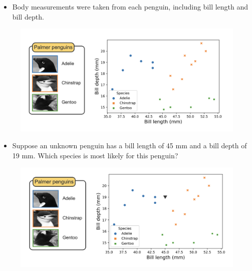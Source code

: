 \documentclass[8pt,dvipsnames]{beamer}
\begin{document}
\begin{frame}{}
	\begin{itemize}
		\item Body measurements were taken from each penguin, including bill length and bill depth.
	\end{itemize}
	\begin{figure}
		\centering
		\includegraphics[width=\textwidth]{imgs/knn_3.png}
	\end{figure}
\end{frame}

\begin{frame}
	\begin{itemize}
		\item Suppose an unknown penguin has a bill length of 45 mm and a bill depth of 19 mm. Which species is most likely for this penguin?
	\end{itemize}
	\begin{figure}[ht]
		\centering
		\includegraphics[width=\linewidth]{imgs/knn_4.png}
	\end{figure}
\end{frame}
\end{document}

